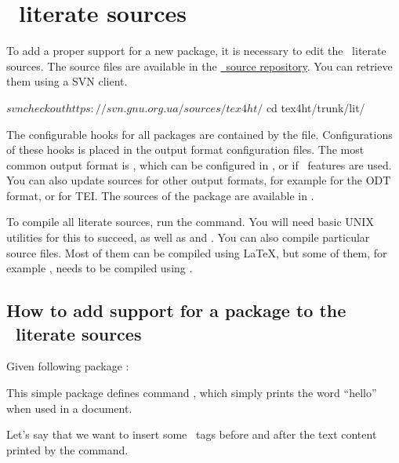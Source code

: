 \section{\texfourht\ literate sources}

To add a proper support for a new package, it is necessary to edit the 
\texfourht\ literate sources. 
The source files are available in the \href{https://puszcza.gnu.org.ua/projects/tex4ht/}{\texfourht\ source repository}.
You can retrieve them using a SVN client. 

\begin{shellcommand}
$ svn checkout https://svn.gnu.org.ua/sources/tex4ht/
$ cd tex4ht/trunk/lit/
\end{shellcommand}


The configurable hooks for all packages are contained by the  file.
Configurations of these hooks is placed in the output format configuration files.
The most common output format is \HTML, which can be configured in , or 
 if \HTMLV\ features are used. You can also update sources for other output
formats, for example  for the ODT format, or  for TEI.
The sources of the  package are available in .

To compile all literate sources, run the  command. You will need basic UNIX utilities 
for this to succeed, as well as  and . You can also compile particular source
files. Most of them can be compiled using \LaTeX, but some of them, for example , needs
to be compiled using .

\subsection{How to add support for a package to the \texfourht\ literate sources}

Given following package :


This simple package defines command \texcommand{\hello}, which simply prints the word \enquote{hello} when used in a document.

Let's say that we want to insert some \HTML\ tags before and after the text content printed by the command.

